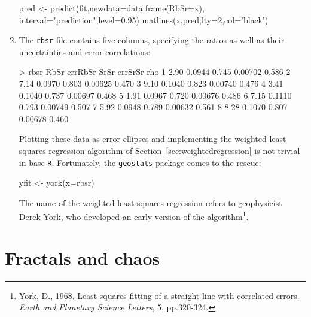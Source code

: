 \begin{enumerate}
\begin{script}[firstnumber=7]
pred <- predict(fit,newdata=data.frame(RbSr=x),
                interval="prediction",level=0.95)
matlines(x,pred,lty=2,col='black')
\end{script}

\item The \texttt{rbsr} file contains five columns, specifying the
  ratios as well as their uncertainties and error correlations:

\begin{console}
> rbsr
  RbSr errRbSr  SrSr errSrSr   rho
1 2.90  0.0944 0.745 0.00702 0.586
2 7.14  0.0970 0.803 0.00625 0.470
3 9.10  0.1040 0.823 0.00740 0.476
4 3.41  0.1040 0.737 0.00697 0.468
5 1.91  0.0967 0.720 0.00676 0.486
6 7.15  0.1110 0.793 0.00749 0.507
7 5.92  0.0948 0.789 0.00632 0.561
8 8.28  0.1070 0.807 0.00678 0.460
\end{console}

Plotting these data as error ellipses and implementing the
weighted least squares regression algorithm of
Section~\ref{sec:weightedregression} is not trivial in base
\texttt{R}. Fortunately, the \texttt{geostats} package comes to the
rescue:

\begin{console}
yfit <- york(x=rbsr)
\end{console}

The name of the weighted least squares regression refers to
geophysicist Derek York, who developed an early version of the
algorithm\footnote{York, D., 1968. Least squares fitting of a straight
  line with correlated errors. \emph{Earth and Planetary Science
    Letters}, 5, pp.320-324.}.

\end{enumerate}

\section{Fractals and chaos}
\label{sec:R-fractals}

